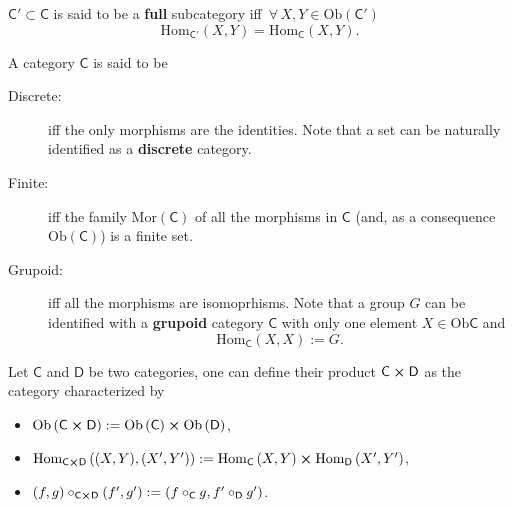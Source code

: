 \begin{defn}
	$\mathsf{C}' \subset \mathsf{C}$ is said to be a \textbf{full} subcategory iff $\,\forall\, X, Y \in \mathrm{Ob}(\mathsf{C}')$ 
	\begin{equation}
	\mathrm{Hom}_{\mathsf{C}'} \left( X, Y \right) = \mathrm{Hom}_{\mathsf{C}} \left( X, Y \right)
	.\end{equation} 
\end{defn}

\begin{defn}
	A category $\mathsf{C}$ is said to be
	\begin{description}
		\item[Discrete:] iff the only morphisms are the identities.
			Note that a set can be naturally identified as a \textbf{discrete} category.
		\item[Finite:] iff the family $\mathrm{Mor}(\mathsf{C})$ of all the morphisms in $\mathsf{C}$ (and, as a consequence $\mathrm{Ob}(\mathsf{C})$) is a finite set.
		\item[Grupoid:] iff all the morphisms are isomoprhisms.
			Note that a group $G$ can be identified with a \textbf{grupoid} category $\mathsf{C}$ with only one element $X \in \mathrm{Ob}\mathsf{C}$ and
			\begin{equation}
				\mathrm{Hom}_{\mathsf{C}} \left( X, X \right) := G
			.\end{equation} 
	\end{description} 
\end{defn}

\begin{defn}
	Let $\mathsf{C}$ and $\mathsf{D}$ be two categories, one can define their product $\mathsf{C}\cross \mathsf{D}$ as the category characterized by
	\begin{itemize}
		\item $\mathrm{Ob} \left(\mathsf{C}\cross \mathsf{D}\right) := \mathrm{Ob} \left(\mathsf{C}\right) \cross \mathrm{Ob} \left(\mathsf{D}\right)$,
		\item $\mathrm{Hom}_{\mathsf{C}\cross \mathsf{D}} \left( (X,Y), (X',Y') \right) := \mathrm{Hom}_{\mathsf{C}} \left( X, Y \right) \cross \mathrm{Hom}_{\mathsf{D}} \left( X', Y' \right)$,
		\item $\left(f, g\right)\circ_{\mathsf{C}\cross \mathsf{D}}\left(f', g'\right) := \left(f \circ_{\mathsf{C}}g, f' \circ_{\mathsf{D}} g' \right)$.
	\end{itemize} 
\end{defn}

